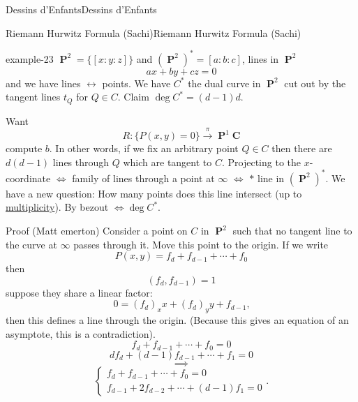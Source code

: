 \documentclass[10pt,]{book}
\numberwithin{equation}{section}
\newcommand{\lb}{[}
\newcommand{\rb}{]}
\newcommand{\CC}{\mathbf{C}}
\DeclareMathOperator{\PP}{\mathbf{P}}
\begin{document}
\begin{chapterptx}{Dessins d'Enfants}{}{Dessins d'Enfants}{}{}
\begin{sectionptx}{Riemann Hurwitz Formula (Sachi)}{}{Riemann Hurwitz Formula (Sachi)}{}{}
\begin{example}{}{example-23}
\(\PP^2 = \{ \lb x:y:z \rb\}\) and \((\PP^2)^* = \lb a:b:c \rb\), lines in \(\PP^2\)%
\begin{equation*}
ax + by + cz = 0
\end{equation*}
and we have lines \(\leftrightarrow\) points. We have \(C^*\) the dual curve in \(\PP^2\) cut out by the tangent lines \(t_Q\) for \(Q \in C\). Claim \(\deg C^* = (d-1)d\).%
\par
\hypertarget{p-521}{}%
Want%
\begin{equation*}
R:\{P(x,y) = 0\} \xrightarrow\pi \PP^1\CC
\end{equation*}
compute \(b\). In other words, if we fix an arbitrary point \(Q\in C\) then there are \(d(d-1)\) lines through \(Q\) which are tangent to \(C\). Projecting to the \(x\)-coordinate \(\iff\) family of lines through a point at \(\infty\) \(\iff\) \(\ast\) line in \((\PP^2)^*\). We have a new question: How many points does this line intersect (up to \hyperref[def-riem-order-vanish]{multiplicity}). By bezout \(\iff  \deg C^*\).%
\par
\hypertarget{p-522}{}%
Proof (Matt emerton) Consider a point on \(C\) in \(\PP^2\) such that no tangent line to the curve at   \(\infty\) passes through it. Move this point to the origin. If we write%
\begin{equation*}
P(x,y) = f_d + f_{d-1} + \cdots + f_0
\end{equation*}
then%
\begin{equation*}
(f_d, f_{d-1}) = 1
\end{equation*}
suppose they share a linear factor:%
\begin{equation*}
0 = (f_d)_x x + (f_d)_y y + f_{d-1}\text{,}
\end{equation*}
then this defines a line through the origin. (Because this gives an equation of an asymptote, this is a contradiction).%
\begin{equation*}
f_d + f_{d-1} + \cdots + f_0 = 0
\end{equation*}
%
\begin{equation*}
d f_d + (d-1) f_{d-1} + \cdots + f_1 = 0
\end{equation*}
%
\begin{equation*}
\implies
\end{equation*}
%
\begin{equation*}
\begin{cases}  f_d + f_{d-1} + \cdots + f_0 = 0 \\ f_{d-1} + 2f_{d-2} + \cdots + (d-1) f_1 = 0\end{cases}\text{.}

\end{equation*}
\end{example}
\end{sectionptx}
\end{chapterptx}
\end{document}
